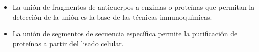 \begin{itemize}
\item La unión de fragmentos de anticuerpos a enzimas o proteínas que permitan la detección de la unión es la base de las técnicas inmunoquímicas.
\item La unión de segmentos de secuencia específica permite la purificación de proteínas a partir del lisado celular. 

\end{itemize}









